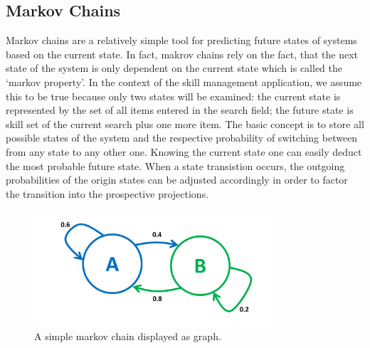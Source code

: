 \subsection{Markov Chains}
Markov chains are a relatively simple tool for predicting future states of systems based on the current state. In fact, makrov chains rely on the fact, that the next state of the system is only dependent on the current state which is called the `markov property'. In the context of the skill management application, we assume this to be true because only two states will be examined: the current state is represented by the set of all items entered in the search field; the future state is skill set of the current search plus one more item.
The basic concept is to store all possible states of the system and the respective probability of switching between from any state to any other one.
Knowing the current state one can easily deduct the most probable future state. When a state transistion occurs, the outgoing probabilities of the origin states
can be adjusted accordingly in order to factor the transition into the prospective projections.
\begin{figure}[!htp]
    \centering
    \includegraphics[width=0.8\textwidth]{images/markov-chain.png}
    \caption[Markov Chain]{A simple markov chain displayed as graph.}
    \label{fig:markovchain}
\end{figure}

